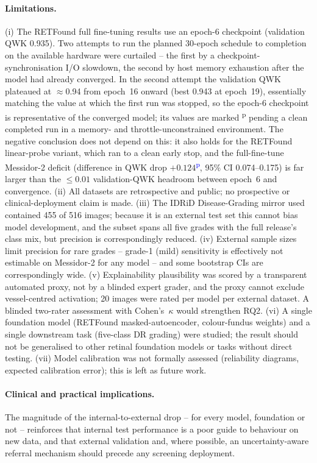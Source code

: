 \documentclass[11pt,a4paper]{article}
\newcommand{\prov}[1]{#1\textsuperscript{\textcolor{blue}{p}}} %
\begin{document}
\paragraph{Limitations.}
(i) The RETFound full fine-tuning results use an epoch-6 checkpoint (validation
QWK \num{0.935}). Two attempts to run the planned 30-epoch schedule to completion
on the available hardware were curtailed -- the first by a
checkpoint-synchronisation I/O slowdown, the second by host memory exhaustion
after the model had already converged. In the second attempt the validation QWK
plateaued at $\approx$\num{0.94} from epoch~16 onward (best \num{0.943} at
epoch~19), essentially matching the value at which the first run was stopped, so
the epoch-6 checkpoint is representative of the converged model; its values are
marked \textsuperscript{p} pending a clean completed run in a memory- and
throttle-unconstrained environment. The negative conclusion does not depend on
this: it also holds for the RETFound linear-probe variant, which ran to a clean
early stop, and the full-fine-tune Messidor-2 deficit (difference in QWK drop
\prov{$+0.124$}, 95\% CI \numrange{0.074}{0.175}) is far larger than the
$\leq \num{0.01}$ validation-QWK headroom between epoch~6 and convergence.
(ii) All datasets are retrospective and public; no prospective or
clinical-deployment claim is made.
(iii) The IDRiD Disease-Grading mirror used contained 455 of 516 images; because
it is an external test set this cannot bias model development, and the subset
spans all five grades with the full release's class mix, but precision is
correspondingly reduced.
(iv) External sample sizes limit precision for rare grades -- grade-1 (mild)
sensitivity is effectively not estimable on Messidor-2 for any model -- and some
bootstrap CIs are correspondingly wide.
(v) Explainability plausibility was scored by a transparent automated proxy, not
by a blinded expert grader, and the proxy cannot exclude vessel-centred
activation; 20 images were rated per model per external dataset. A blinded
two-rater assessment with Cohen's~$\kappa$ would strengthen RQ2.
(vi) A single foundation model (RETFound masked-autoencoder, colour-fundus
weights) and a single downstream task (five-class DR grading) were studied; the
result should not be generalised to other retinal foundation models or tasks
without direct testing.
(vii) Model calibration was not formally assessed (reliability diagrams, expected
calibration error); this is left as future work.

\paragraph{Clinical and practical implications.} The magnitude of the
internal-to-external drop -- for every model, foundation or not -- reinforces
that internal test performance is a poor guide to behaviour on new data, and
that external validation and, where possible, an uncertainty-aware referral
mechanism should precede any screening deployment.
\end{document}
